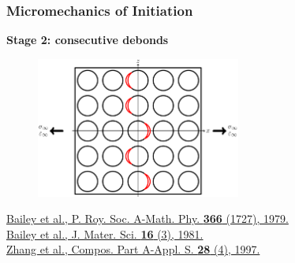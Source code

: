 \documentclass[first,firstsupp,lastsupp,last,hyperref,table]{ETHclass}
\begin{document}
\begin{frame}
\frametitle{\vspace{0.2cm}\small Micromechanics of Initiation}
\vspace{-0.5cm}
\centering
\begin{alertblock}{\centering\scriptsize\bf Stage 2: consecutive debonds}
\vspace{-0.25cm}
\begin{figure}
\centering
\includegraphics[width=0.6\textwidth]{stage2-critdebonds.pdf}
\end{figure}
\end{alertblock}
\vspace{-0.5cm}
\centering
\pgfmathsetmacro{}
\pgfmathsetmacro{}
{\centering\fontsize{\fontsizeref}{\stretchref} \selectfont \href{https://doi.org/10.1098/rspa.1979.0071}{Bailey et al., P. Roy. Soc. A-Math. Phy. \textbf{366} (1727), 1979.}}\\\vspace{-5pt}
{\centering\fontsize{\fontsizeref}{\stretchref} \selectfont \href{https://doi.org/10.1007/BF00552203}{Bailey et al., J. Mater. Sci. \textbf{16} (3), 1981.}}\\\vspace{-5pt}
{\centering\fontsize{\fontsizeref}{\stretchref} \selectfont \href{https://doi.org/10.1016/S1359-835X(96)00123-6}{Zhang et al., Compos. Part A-Appl. S. \textbf{28} (4), 1997.}}\\\vspace{1pt}
\end{frame}

\addtocounter{framenumber}{-1}
\end{document}

